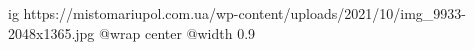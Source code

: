  
 
 
 
 

\ifcmt
  ig https://mistomariupol.com.ua/wp-content/uploads/2021/10/img_9933-2048x1365.jpg
  @wrap center
  @width 0.9
\fi
